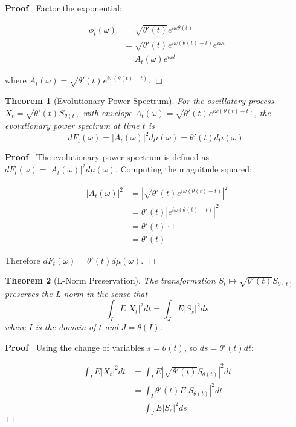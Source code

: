\documentclass{article}
\newenvironment{proof}{\noindent\textbf{Proof\ }}{\hspace*{\fill}$\Box$\medskip}
\newtheorem{theorem}{Theorem}
\begin{document}
\begin{proof}
  Factor the exponential:
  
  \begin{align}
    \phi_t (\omega) & = \sqrt{\theta' (t)} e^{i \omega \theta (t)} \\
    & = \sqrt{\theta' (t)} e^{i \omega (\theta (t) - t)} e^{i \omega t} \\
    & = A_t (\omega) e^{i \omega t} 
  \end{align}
  
  where $A_t (\omega) = \sqrt{\theta' (t)} e^{i \omega (\theta (t) - t)}$.
\end{proof}

\begin{theorem}
  [Evolutionary Power Spectrum] For the oscillatory process $X_t =
  \sqrt{\theta' (t)} S_{\theta (t)}$ with envelope $A_t (\omega) =
  \sqrt{\theta' (t)} e^{i \omega (\theta (t) - t)}$, the evolutionary power
  spectrum at time $t$ is
  \[ dF_t (\omega) = |A_t (\omega) |^2 d \mu (\omega) = \theta' (t) d \mu
     (\omega) . \]
\end{theorem}

\begin{proof}
  The evolutionary power spectrum is defined as $dF_t (\omega) = |A_t (\omega)
  |^2 d \mu (\omega)$. Computing the magnitude squared:
  
  \begin{align}
    |A_t (\omega) |^2 & = \left| \sqrt{\theta' (t)} e^{i \omega (\theta (t) -
    t)} \right|^2 \\
    & = \theta' (t) | e^{i \omega (\theta (t) - t)} |^2 \\
    & = \theta' (t) \cdot 1 \\
    & = \theta' (t) 
  \end{align}
  
  Therefore $dF_t (\omega) = \theta' (t) d \mu (\omega)$.
\end{proof}

\begin{theorem}
  [L{\texttwosuperior}-Norm Preservation] The transformation $S_t \mapsto
  \sqrt{\theta' (t)} S_{\theta (t)}$ preserves the L{\texttwosuperior}-norm in
  the sense that
  \[ \int_I E |X_t |^2 dt = \int_J E |S_s |^2 ds \]
  where $I$ is the domain of $t$ and $J = \theta (I)$.
\end{theorem}

\begin{proof}
  Using the change of variables $s = \theta (t)$, so $ds = \theta' (t) dt$:
  
  \begin{align}
    \int_I E |X_t |^2 dt & = \int_I E \left| \sqrt{\theta' (t)} S_{\theta (t)}
    \right|^2 dt \\
    & = \int_I \theta' (t) E |S_{\theta (t)} |^2 dt \\
    & = \int_J E |S_s |^2 ds 
  \end{align}
\end{proof}
\end{document}
